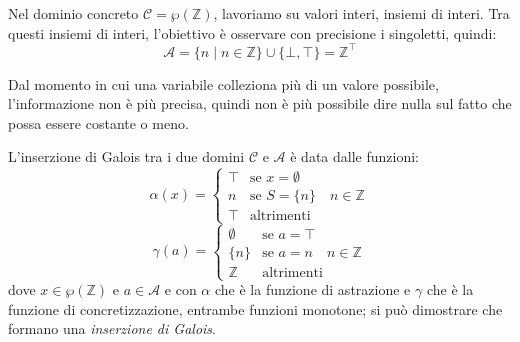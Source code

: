 Nel dominio concreto $\mathcal{C}= \wp(\mathbb{Z})$, lavoriamo su valori interi, 
insiemi di interi. Tra questi insiemi di interi, l'obiettivo è osservare con 
precisione i singoletti, quindi:
\[
    \mathcal{A} = \{n \mid n \in \mathbb{Z}\} \cup \{\bot, \top\} = \mathbb{Z}^\top
\]

Dal momento in cui una variabile colleziona più di un valore possibile,
l'informazione non è più precisa, quindi non è più possibile dire nulla 
sul fatto che possa essere costante o meno.

L'inserzione di Galois tra i due domini $\mathcal{C}$ e $\mathcal{A}$ è 
data dalle funzioni: 
\[
    \alpha(x) = 
    \begin{cases}
        \top & \text{se } x = \emptyset \\
        n & \text{se } S = \{n\} \quad n\in \mathbb{Z} \\
        \top & \text{altrimenti}
    \end{cases}
\]
\[
    \gamma(a) = 
    \begin{cases}
        \emptyset & \text{se } a = \top \\
        \{n\} & \text{se } a = n \quad n\in \mathbb{Z} \\
        \mathbb{Z} & \text{altrimenti}
    \end{cases}
\]
dove $x \in \wp(\mathbb{Z})$ e $a \in \mathcal{A}$ e
con $\alpha$ che è la funzione di astrazione e $\gamma$ che è la funzione di concretizzazione, 
entrambe funzioni monotone; si può dimostrare che formano una \textit{inserzione di Galois}.
\begin{figure}[H]
    \centering
\end{figure}